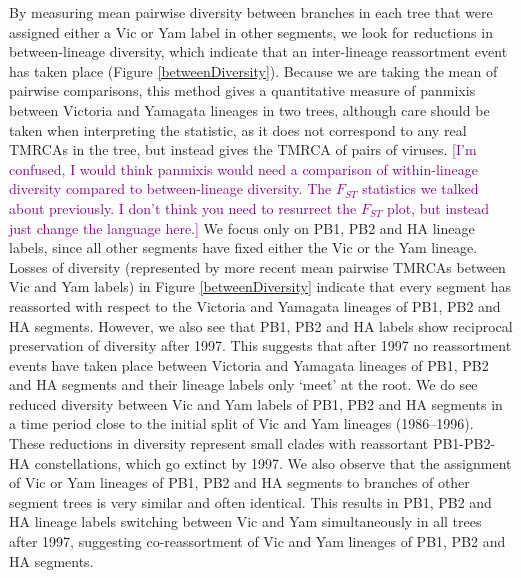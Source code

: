 \documentclass[11pt,oneside,letterpaper]{article}
\def\tbc#1{\textcolor{purple}{[#1]}}
\begin{document}
By measuring mean pairwise diversity between branches in each tree that were assigned either a Vic or Yam label in other segments, we look for reductions in between-lineage diversity, which indicate that an inter-lineage reassortment event has taken place (Figure \ref{betweenDiversity}).
Because we are taking the mean of pairwise comparisons, this method gives a quantitative measure of panmixis between Victoria and Yamagata lineages in two trees, although care should be taken when interpreting the statistic, as it does not correspond to any real TMRCAs in the tree, but instead gives the TMRCA of pairs of viruses.
\tbc{I'm confused, I would think panmixis would need a comparison of within-lineage diversity compared to between-lineage diversity.  The $F_{ST}$ statistics we talked about previously.  I don't think you need to resurrect the $F_{ST}$ plot, but instead just change the language here.}
We focus only on PB1, PB2 and HA lineage labels, since all other segments have fixed either the Vic or the Yam lineage.
Losses of diversity (represented by more recent mean pairwise TMRCAs between Vic and Yam labels) in Figure \ref{betweenDiversity} indicate that every segment has reassorted with respect to the Victoria and Yamagata lineages of PB1, PB2 and HA segments.
However, we also see that PB1, PB2 and HA labels show reciprocal preservation of diversity after 1997.
This suggests that after 1997 no reassortment events have taken place between Victoria and Yamagata lineages of PB1, PB2 and HA segments and their lineage labels only `meet' at the root.
We do see reduced diversity between Vic and Yam labels of PB1, PB2 and HA segments in a time period close to the initial split of Vic and Yam lineages (1986--1996).
These reductions in diversity represent small clades with reassortant PB1-PB2-HA constellations, which go extinct by 1997.
We also observe that the assignment of Vic or Yam lineages of PB1, PB2 and HA segments to branches of other segment trees is very similar and often identical.
This results in PB1, PB2 and HA lineage labels switching between Vic and Yam simultaneously in all trees after 1997, suggesting co-reassortment of Vic and Yam lineages of PB1, PB2 and HA segments. 
\end{document}
